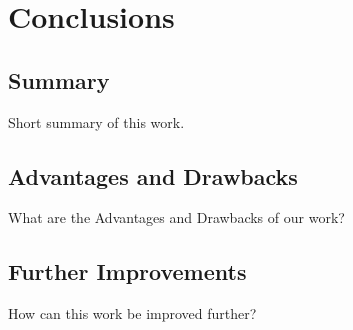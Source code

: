 \section{Conclusions}

\subsection{Summary}

Short summary of this work.

\subsection{Advantages and Drawbacks}

What are the Advantages and Drawbacks of our work?

\subsection{Further Improvements}

How can this work be improved further?